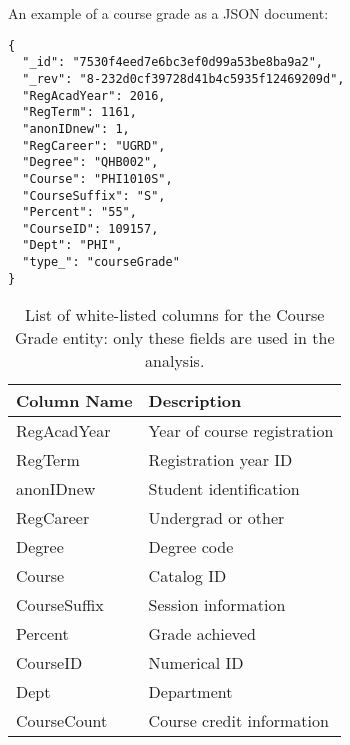 An example of a course grade as a JSON document:

\begin{verbatim}
{
  "_id": "7530f4eed7e6bc3ef0d99a53be8ba9a2",
  "_rev": "8-232d0cf39728d41b4c5935f12469209d",
  "RegAcadYear": 2016,
  "RegTerm": 1161,
  "anonIDnew": 1,
  "RegCareer": "UGRD",
  "Degree": "QHB002",
  "Course": "PHI1010S",
  "CourseSuffix": "S",
  "Percent": "55",
  "CourseID": 109157,
  "Dept": "PHI",
  "type_": "courseGrade"
}
\end{verbatim}

\begin{table}[]
  \centering
  \caption{List of white-listed columns for the Course Grade entity: only these fields are used in the analysis.}
  \label{Grades Columns}
  \begin{tabular}{ll}
    Column Name  & Description                 \\ \hline
    RegAcadYear  & Year of course registration \\
    RegTerm      & Registration year ID        \\
    anonIDnew    & Student identification      \\
    RegCareer    & Undergrad or other          \\
    Degree       & Degree code                 \\
    Course       & Catalog ID                  \\
    CourseSuffix & Session information         \\
    Percent      & Grade achieved              \\
    CourseID     & Numerical ID                \\
    Dept         & Department                  \\
    CourseCount  & Course credit information   \\ \hline
  \end{tabular}
\end{table}

